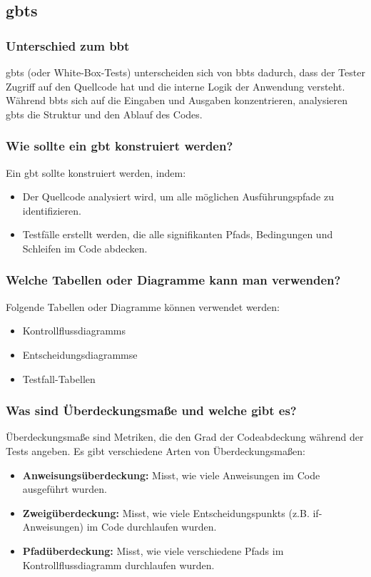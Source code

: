 \documentclass[main.tex]{subfiles}
\begin{document}
\subsection{\glspl{gbt} }
\subsubsection*{Unterschied zum \gls{bbt}}
\glspl{gbt}  (oder White-Box-Tests) unterscheiden sich von \glspl{bbt} dadurch, dass der Tester Zugriff auf den Quellcode hat und die interne Logik der Anwendung versteht. Während \glspl{bbt} sich auf die Eingaben und Ausgaben konzentrieren, analysieren \glspl{gbt}  die Struktur und den Ablauf des Codes.


\subsubsection*{Wie sollte ein \gls{gbt}  konstruiert werden?}
Ein \gls{gbt} sollte konstruiert werden, indem:
\begin{itemize}
    \item Der Quellcode analysiert wird, um alle möglichen Ausführungspfade zu identifizieren.
    \item Testfälle erstellt werden, die alle signifikanten \glspl{Pfad}, Bedingungen und Schleifen im Code abdecken.
\end{itemize}

\subsubsection*{Welche Tabellen oder Diagramme kann man verwenden?}
Folgende Tabellen oder Diagramme können verwendet werden:
\begin{itemize}
    \item \glspl{Kontrollflussdiagramm}
    \item \glspl{Entscheidungsdiagramm}e
    \item Testfall-Tabellen
\end{itemize}

\subsubsection*{Was sind Überdeckungsmaße und welche gibt es?}
Überdeckungsmaße sind Metriken, die den Grad der Codeabdeckung während der Tests angeben. Es gibt verschiedene Arten von Überdeckungsmaßen:
\begin{itemize}
    \item \textbf{Anweisungsüberdeckung:} Misst, wie viele Anweisungen im Code ausgeführt wurden.
    \item \textbf{\gls{Zweigüberdeckung}:} Misst, wie viele \glspl{Entscheidungspunkt} (z.B. if-Anweisungen) im Code durchlaufen wurden.
    \item \textbf{\gls{Pfadüberdeckung}:} Misst, wie viele verschiedene \glspl{Pfad} im \gls{Kontrollflussdiagramm} durchlaufen wurden.
\end{itemize}
\end{document}
